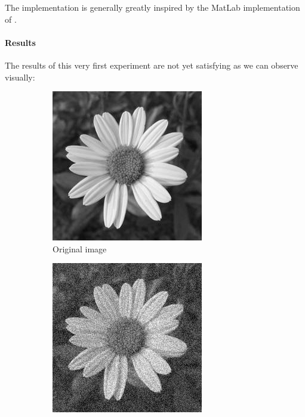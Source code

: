 The implementation is generally greatly inspired by the MatLab implementation of \cite{glide_2014}.

\paragraph{Results}
The results of this very first experiment are not yet satisfying as we can observe visually:

\begin{figure}
    \centering
    \begin{subfigure}[b]{0.32\textwidth}
        \includegraphics[width=\textwidth]{img/flowerOriginal.png}
        \caption{Original image}
    \end{subfigure}
    \begin{subfigure}[b]{0.32\textwidth}
        \includegraphics[width=\textwidth]{img/flowerNoisy.png}

\end{subfigure}
\end{figure}
